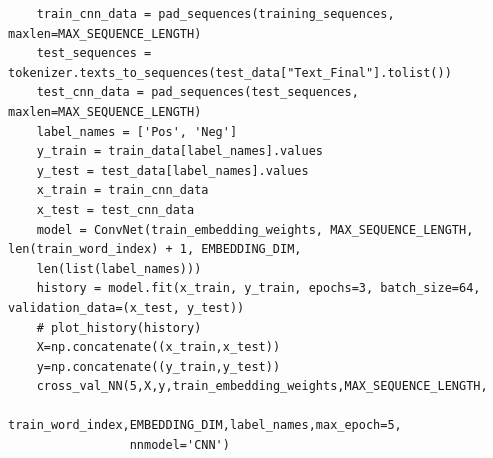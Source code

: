 \documentclass[11pt]{article} %
\begin{document}
\begin{verbatim}
    train_cnn_data = pad_sequences(training_sequences, maxlen=MAX_SEQUENCE_LENGTH)
    test_sequences = tokenizer.texts_to_sequences(test_data["Text_Final"].tolist())
    test_cnn_data = pad_sequences(test_sequences, maxlen=MAX_SEQUENCE_LENGTH)
    label_names = ['Pos', 'Neg']
    y_train = train_data[label_names].values
    y_test = test_data[label_names].values
    x_train = train_cnn_data
    x_test = test_cnn_data
    model = ConvNet(train_embedding_weights, MAX_SEQUENCE_LENGTH, len(train_word_index) + 1, EMBEDDING_DIM,
    len(list(label_names)))
    history = model.fit(x_train, y_train, epochs=3, batch_size=64, validation_data=(x_test, y_test))
    # plot_history(history)
    X=np.concatenate((x_train,x_test))
    y=np.concatenate((y_train,y_test))
    cross_val_NN(5,X,y,train_embedding_weights,MAX_SEQUENCE_LENGTH,
                 train_word_index,EMBEDDING_DIM,label_names,max_epoch=5,
                 nnmodel='CNN')
\end{verbatim}
\newpage
\end{document}
